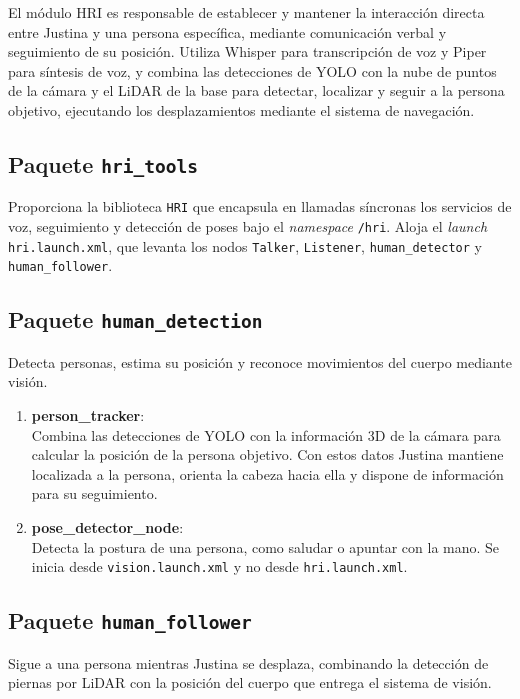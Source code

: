 El módulo HRI es responsable de establecer y mantener la interacción directa entre Justina y una persona específica, mediante comunicación verbal y seguimiento de su posición. Utiliza Whisper para transcripción de voz y Piper para síntesis de voz, y combina las detecciones de YOLO con la nube de puntos de la cámara y el LiDAR de la base para detectar, localizar y seguir a la persona objetivo, ejecutando los desplazamientos mediante el sistema de navegación.

\subsection{Paquete \texttt{hri\_tools}}
Proporciona la biblioteca \texttt{HRI} que encapsula en llamadas síncronas los servicios de voz, seguimiento y detección de poses bajo el \textit{namespace} \texttt{/hri}. Aloja el \textit{launch} \texttt{hri.launch.xml}, que levanta los nodos \texttt{Talker}, \texttt{Listener}, \texttt{human\_detector} y \texttt{human\_\allowbreak{}follower}.

\subsection{Paquete \texttt{human\_detection}}
Detecta personas, estima su posición y reconoce movimientos del cuerpo mediante visión.

\begin{enumerate}
    \item \textbf{person\_tracker}: \\
    Combina las detecciones de YOLO con la información 3D de la cámara para calcular la posición de la persona objetivo. Con estos datos Justina mantiene localizada a la persona, orienta la cabeza hacia ella y dispone de información para su seguimiento.

    \item \textbf{pose\_detector\_node}: \\
    Detecta la postura de una persona, como saludar o apuntar con la mano. Se inicia desde \texttt{vision.launch.xml} y no desde \texttt{hri.launch.xml}.
\end{enumerate}

\subsection{Paquete \texttt{human\_follower}}
Sigue a una persona mientras Justina se desplaza, combinando la detección de piernas por LiDAR con la posición del cuerpo que entrega el sistema de visión.

